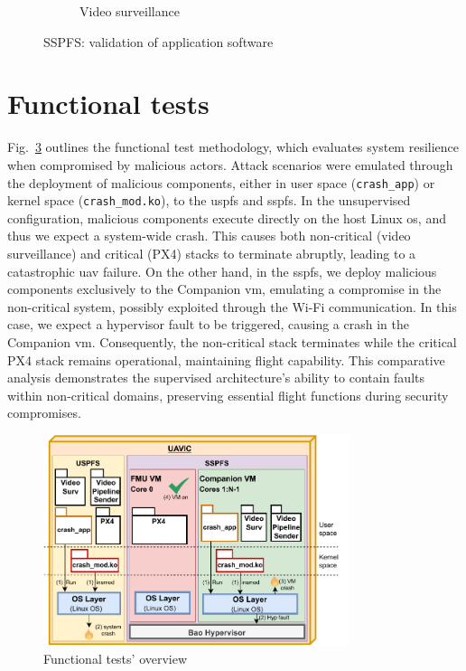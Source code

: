 \begin{figure}[!hbt]
\begin{subfigure}[t]{0.49\textwidth}
    \caption{Video surveillance}%
    \label{fig:sspfs-app-validation-2}
  \end{subfigure}
  \caption{SSPFS: validation of application software}
  \label{fig:sspfs-app-validation}
\end{figure}

\section{Functional tests}
\label{sec:functional-tests}
Fig.~\ref{fig:uav-main-eval-kmod} outlines the functional test methodology,
which evaluates system resilience when compromised by malicious actors. Attack
scenarios were emulated through the deployment of malicious components, either
in user space (\lstinline{crash_app}) or kernel space
(\lstinline{crash_mod.ko}), to the \gls{uspfs} and \gls{sspfs}.
In the unsupervised configuration, malicious components execute directly on the
host Linux \gls{os}, and thus we expect a system-wide crash. This causes both
non-critical (video surveillance) and critical (PX4) stacks to terminate
abruptly, leading to a catastrophic \gls{uav} failure. On the other hand, in the
\gls{sspfs}, we deploy malicious components exclusively to the Companion
\gls{vm}, emulating a compromise in the non-critical system, possibly exploited
through the Wi-Fi communication. In this case, we expect a hypervisor fault
to be triggered, causing a crash in the Companion \gls{vm}. Consequently, the
non-critical stack terminates while the critical PX4 stack remains operational,
maintaining flight capability.
%
This comparative analysis demonstrates the supervised architecture's ability to
contain faults within non-critical domains, preserving essential flight
functions during security compromises.

\begin{figure}[!hbt]
  \centering
  \includegraphics[width=0.8\textwidth]{./img/pdf/uav-main-eval-funcTest} 
%   
  \caption{Functional tests' overview}%
  \label{fig:uav-main-eval-kmod}
\end{figure}

